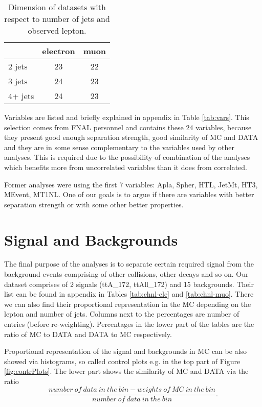 \begin{table}[htb]
\caption{Dimension of datasets with respect to number of jets and observed lepton.}
\centering
\begin{tabular}{|l|c|c|}
\hline 
 & electron & muon \\ 
\hline 
2 jets & 23 & 22 \\ 
\hline 
3 jets & 24 & 23 \\ 
\hline 
4+ jets & 24 & 23 \\ 
\hline 
\end{tabular} 
\label{tab:data-dims}
\end{table}

Variables are listed and briefly explained in appendix in Table \ref{tab:vars}. This selection comes from  FNAL personnel and contains these 24 variables, because they present good enough separation strength, good similarity of MC and DATA and they are in some sense complementary to the variables used by other analyses. This is required due to the possibility of combination of the analyses which benefits more from uncorrelated variables than it does from correlated. 

Former analyses were using the first 7 variables: \textsf{Apla, Spher, HTL, JetMt, HT3, MEvent, MT1NL}. One of our goals is to argue if there are variables with better separation strength or with some other better properties. 

\section{Signal and Backgrounds}


The final purpose of the analyses is to separate certain required signal from the background events comprising of other collisions, other decays and so on. Our dataset comprises of 2 signals (\textsf{ttA\_172, ttAll\_172}) and 15 backgrounds. Their list can be found in appendix in Tables \ref{tab:chnl-ele} and \ref{tab:chnl-muo}. There we can also find their proportional representation in the MC depending on the lepton and number of jets. Columns next to the percentages are number of entries (before re-weighting). Percentages in the lower part of the tables are the ratio of MC to DATA and DATA to MC respectively.

Proportional representation of the signal and backgrounds in MC can be also showed via histograms, so called control plots e.g. in the top part of Figure \ref{fig:contrPlots}. The lower part shows the similarity of MC and DATA via the ratio
\begin{equation*}
\frac{number\:of\:data\:in\:the\:bin - weights\:of\:MC\:in\:the\:bin}{number\:of\:data\:in\:the\:bin}.
\end{equation*}


